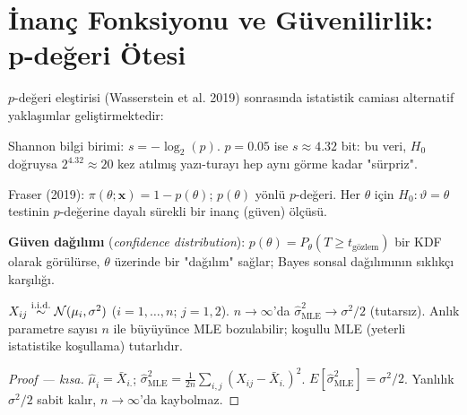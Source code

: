 \section{İnanç Fonksiyonu ve Güvenilirlik: p-değeri Ötesi}
\label{sec:p_otesi}

$p$-değeri eleştirisi (Wasserstein et al. 2019) sonrasında istatistik camiası alternatif yaklaşımlar geliştirmektedir:

\begin{tanim}[$s$-değeri]\label{def:s_degeri}
Shannon bilgi birimi: $s = -\log_2(p)$. $p=0.05$ ise $s\approx4.32$ bit: bu veri, $H_0$ doğruysa $2^{4.32}\approx20$ kez atılmış yazı-turayı hep aynı görme kadar "sürpriz".
\end{tanim}

\begin{tanim}\label{def:inanc_fonksiyonu}
Fraser (2019): $\pi(\theta;\mathbf{x})=1-p(\theta)$; $p(\theta)$ yönlü $p$-değeri. Her $\theta$ için $H_0:\vartheta=\theta$ testinin $p$-değerine dayalı sürekli bir inanç (güven) ölçüsü.
\end{tanim}

\noindent\textbf{Güven dağılımı} (\emph{confidence distribution}): $p(\theta)=P_\theta(T\geq t_{\mathrm{gözlem}})$ bir KDF olarak görülürse, $\theta$ üzerinde bir "dağılım" sağlar; Bayes sonsal dağılımının sıklıkçı karşılığı.

\begin{teorem}\label{thm:neyman_scott}
$X_{ij}\overset{\text{i.i.d.}}{\sim}\mathcal{N}(\mu_i,\sigma^2)$ ($i=1,\ldots,n$; $j=1,2$). $n\to\infty$'da $\hat\sigma^2_{\mathrm{MLE}}\to\sigma^2/2$ (tutarsız). Anlık parametre sayısı $n$ ile büyüyünce MLE bozulabilir; koşullu MLE (yeterli istatistike koşullama) tutarlıdır.
\end{teorem}

\begin{proof}[Proof --- kısa]
$\hat\mu_i=\bar X_{i.}$; $\hat\sigma^2_{\mathrm{MLE}}=\frac{1}{2n}\sum_{i,j}(X_{ij}-\bar X_{i.})^2$. $E[\hat\sigma^2_{\mathrm{MLE}}]=\sigma^2/2$. Yanlılık $\sigma^2/2$ sabit kalır, $n\to\infty$'da kaybolmaz.
\end{proof}


